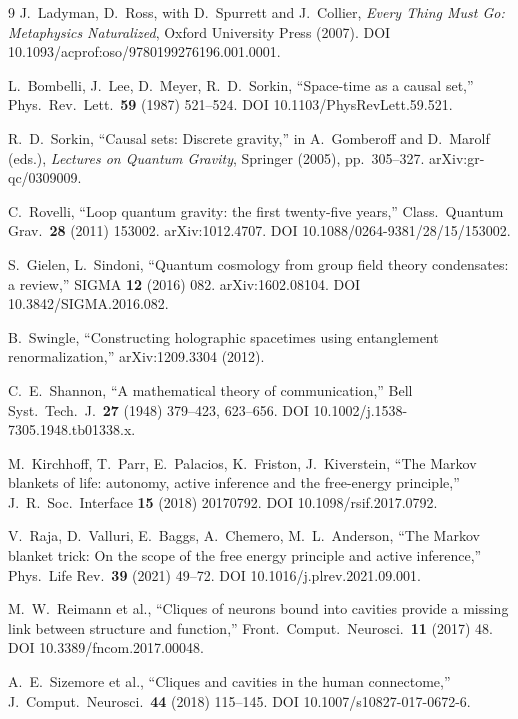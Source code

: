 \begin{thebibliography}{9}
J.~Ladyman, D.~Ross, with D.~Spurrett and J.~Collier,
\textit{Every Thing Must Go: Metaphysics Naturalized}, Oxford University
Press (2007). DOI 10.1093/acprof:oso/9780199276196.001.0001.

L.~Bombelli, J.~Lee, D.~Meyer, R.~D.~Sorkin, ``Space-time as a causal set,''
Phys.\ Rev.\ Lett.\ \textbf{59} (1987) 521--524.
DOI 10.1103/PhysRevLett.59.521.

R.~D.~Sorkin, ``Causal sets: Discrete gravity,'' in A.~Gomberoff and
D.~Marolf (eds.), \textit{Lectures on Quantum Gravity}, Springer (2005),
pp.~305--327. arXiv:gr-qc/0309009.

C.~Rovelli, ``Loop quantum gravity: the first twenty-five years,''
Class.\ Quantum Grav.\ \textbf{28} (2011) 153002.
arXiv:1012.4707. DOI 10.1088/0264-9381/28/15/153002.

S.~Gielen, L.~Sindoni, ``Quantum cosmology from group field theory
condensates: a review,'' SIGMA \textbf{12} (2016) 082.
arXiv:1602.08104. DOI 10.3842/SIGMA.2016.082.

B.~Swingle, ``Constructing holographic spacetimes using entanglement
renormalization,'' arXiv:1209.3304 (2012).

C.~E.~Shannon, ``A mathematical theory of communication,''
Bell Syst.\ Tech.\ J.\ \textbf{27} (1948) 379--423, 623--656.
DOI 10.1002/j.1538-7305.1948.tb01338.x.

M.~Kirchhoff, T.~Parr, E.~Palacios, K.~Friston, J.~Kiverstein,
``The Markov blankets of life: autonomy, active inference and the free-energy
principle,'' J.\ R.\ Soc.\ Interface \textbf{15} (2018) 20170792.
DOI 10.1098/rsif.2017.0792.

V.~Raja, D.~Valluri, E.~Baggs, A.~Chemero, M.~L.~Anderson,
``The Markov blanket trick: On the scope of the free energy principle and
active inference,'' Phys.\ Life Rev.\ \textbf{39} (2021) 49--72.
DOI 10.1016/j.plrev.2021.09.001.

M.~W.~Reimann et al., ``Cliques of neurons bound into cavities provide a
missing link between structure and function,'' Front.\ Comput.\ Neurosci.\
\textbf{11} (2017) 48. DOI 10.3389/fncom.2017.00048.

A.~E.~Sizemore et al., ``Cliques and cavities in the human connectome,''
J.\ Comput.\ Neurosci.\ \textbf{44} (2018) 115--145.
DOI 10.1007/s10827-017-0672-6.


\end{thebibliography}
